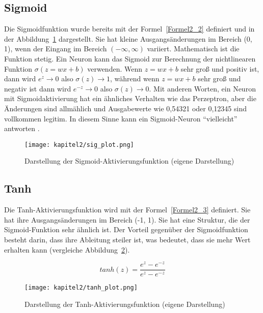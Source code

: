 \subsection{Sigmoid}
Die Sigmoidfunktion wurde bereits mit der Formel~\ref{Formel2_2} definiert und in der Abbildung~\ref{Kap2:Sigmoid_plot} dargestellt. Sie hat kleine Ausgangsänderungen im Bereich (0, 1), wenn der Eingang im Bereich $(-\infty, \infty)$ variiert. Mathematisch ist die Funktion stetig. Ein Neuron kann das Sigmoid zur Berechnung der nichtlinearen Funktion $\sigma(z = wx + b)$ verwenden.
Wenn $z = wx + b$ sehr groß und positiv ist, dann wird $e^z \rightarrow 0$ also $\sigma(z) \rightarrow 1$, während wenn $z = wx + b$ sehr groß und negativ ist dann wird $e^{-z} \rightarrow 0$ also $\sigma(z) \rightarrow 0$. Mit anderen Worten, ein Neuron mit Sigmoidaktivierung hat ein ähnliches Verhalten wie das Perzeptron, aber die Änderungen sind allmählich und Ausgabewerte wie 0,54321 oder 0,12345 sind vollkommen legitim. In diesem Sinne kann ein Sigmoid-Neuron \enquote{vielleicht} antworten \cite*[S. 10]{AntonioGuili;AmitaKapoor;SujitPal2019}.
\begin{figure}[H]
  \centering
  \texttt{[image: kapitel2/sig\_plot.png]}
  \caption[Darstellung der Sigmoid-Aktivierungsfunktion]{Darstellung der Sigmoid-Aktivierungsfunktion (eigene Darstellung)}
  \label{Kap2:Sigmoid_plot}
\end{figure}

\subsection{Tanh}
Die Tanh-Aktivierungsfunktion wird mit der Formel~\ref{Formel2_3} definiert. Sie hat ihre Ausgangsänderungen im Bereich (-1, 1). Sie hat eine Struktur, die der Sigmoid-Funktion sehr ähnlich ist. Der Vorteil gegenüber der Sigmoidfunktion besteht darin, dass ihre Ableitung steiler ist, was bedeutet, dass sie mehr Wert erhalten kann (vergleiche Abbildung~\ref{Kap2:Tanh_plot}).

\begin{equation} \label{Formel2_3}
  tanh(z) = \frac{e^{z}-e^{-z}}{e^{z}-e^{-z}}
\end{equation}

\begin{figure}[H]
  \centering
  \texttt{[image: kapitel2/tanh\_plot.png]}
  \caption[Darstellung der Tanh-Aktivierungsfunktion]{Darstellung der Tanh-Aktivierungsfunktion (eigene Darstellung)}
  \label{Kap2:Tanh_plot}
\end{figure}

